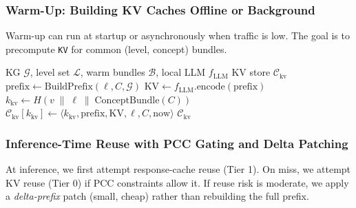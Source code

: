 \documentclass[11pt,a4paper,twocolumn]{article}
\begin{document}
\subsubsection{Warm-Up: Building KV Caches Offline or Background}

Warm-up can run at startup or asynchronously when traffic is low. The goal is to precompute \texttt{KV} for common (level, concept) bundles.

\begin{algorithm}[h]
\caption{WarmKVCache (Proposed)}
\label{alg:warm_kv}
\footnotesize
\begin{algorithmic}[1]
\REQUIRE KG $\mathcal{G}$, level set $\mathcal{L}$, warm bundles $\mathcal{B}$, local LLM $f_{\text{LLM}}$
\ENSURE KV store $\mathcal{C}_{\text{kv}}$
  \STATE $\text{prefix} \leftarrow \text{BuildPrefix}(\ell, C, \mathcal{G})$ 
  \STATE $\text{KV} \leftarrow f_{\text{LLM}}.\text{encode}(\text{prefix})$ 
  \STATE $k_{\text{kv}} \leftarrow H(v \;\|\; \ell \;\|\; \text{ConceptBundle}(C))$
  \STATE $\mathcal{C}_{\text{kv}}[k_{\text{kv}}] \leftarrow \langle k_{\text{kv}}, \text{prefix}, \text{KV}, \ell, C, \text{now}\rangle$
\ENDFOR
\RETURN $\mathcal{C}_{\text{kv}}$
\end{algorithmic}
\end{algorithm}

\subsubsection{Inference-Time Reuse with PCC Gating and Delta Patching}

At inference, we first attempt response-cache reuse (Tier 1). On miss, we attempt KV reuse (Tier 0) if PCC constraints allow it. If reuse risk is moderate, we apply a \emph{delta-prefix} patch (small, cheap) rather than rebuilding the full prefix.
\end{document}
